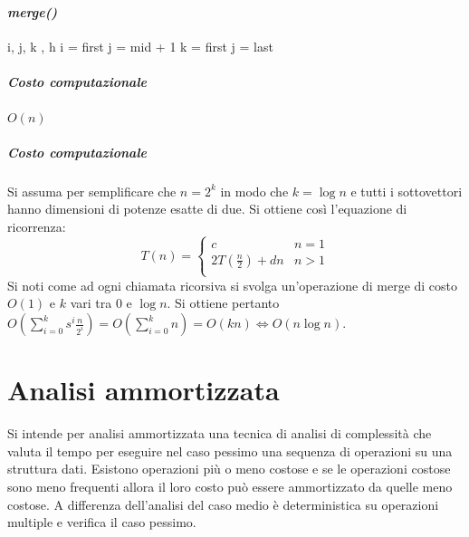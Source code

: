\paragraph{\emph{merge()}}
\begin{algorithm}
\DontPrintSemicolon
{}
\caption{\protect{}}
\Int i, j, k , h\;
i = first\;
j = mid + 1\;
k = first\;
j = last\;
\end{algorithm}
\subparagraph{Costo computazionale} $O(n)$
\begin{algorithm}[H]
\DontPrintSemicolon
{}
\caption{\protect{}}
\end{algorithm}
\subparagraph{Costo computazionale} Si assuma per semplificare che $n = 2^k$ in modo che $k=\log n$ e tutti i sottovettori hanno dimensioni di potenze 
esatte di due. Si ottiene cos\`i l'equazione di ricorrenza:
\begin{equation*}
T(n)=\begin{cases}
c\quad\quad & n=1\\
2T(\frac{n}{2})+dn & n>1\\
\end{cases}
\end{equation*}
Si noti come ad ogni chiamata ricorsiva si svolga un'operazione di merge di costo $O(1)$ e $k$ vari tra $0$ e $\log n$. Si ottiene pertanto 
$O(\sum\limits_{i=0}^ks^i\frac{n}{2^i})=O(\sum\limits_{i=0}^kn)=O(kn)\Leftrightarrow O(n\log n)$. 
\section{Analisi ammortizzata}
Si intende per analisi ammortizzata una tecnica di analisi di complessit\`a che valuta il tempo per eseguire nel caso pessimo una sequenza di operazioni 
su una struttura dati. Esistono operazioni pi\`u o meno costose e se le operazioni costose sono meno frequenti allora il loro costo pu\`o essere 
ammortizzato da quelle meno costose. A differenza dell'analisi del caso medio \`e deterministica su operazioni multiple e verifica il caso pessimo.
